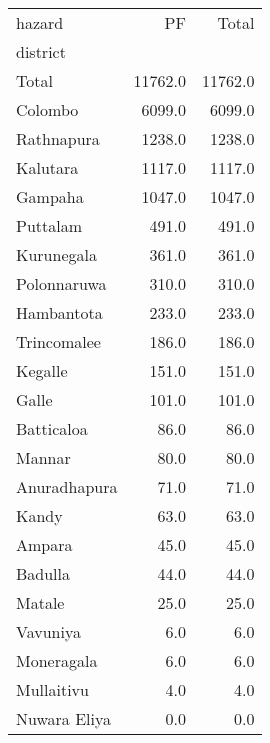 \begin{tabular}{lrr}
\toprule
hazard &       PF &    Total \\
district     &          &          \\
\midrule
Total        &  11762.0 &  11762.0 \\
Colombo      &   6099.0 &   6099.0 \\
Rathnapura   &   1238.0 &   1238.0 \\
Kalutara     &   1117.0 &   1117.0 \\
Gampaha      &   1047.0 &   1047.0 \\
Puttalam     &    491.0 &    491.0 \\
Kurunegala   &    361.0 &    361.0 \\
Polonnaruwa  &    310.0 &    310.0 \\
Hambantota   &    233.0 &    233.0 \\
Trincomalee  &    186.0 &    186.0 \\
Kegalle      &    151.0 &    151.0 \\
Galle        &    101.0 &    101.0 \\
Batticaloa   &     86.0 &     86.0 \\
Mannar       &     80.0 &     80.0 \\
Anuradhapura &     71.0 &     71.0 \\
Kandy        &     63.0 &     63.0 \\
Ampara       &     45.0 &     45.0 \\
Badulla      &     44.0 &     44.0 \\
Matale       &     25.0 &     25.0 \\
Vavuniya     &      6.0 &      6.0 \\
Moneragala   &      6.0 &      6.0 \\
Mullaitivu   &      4.0 &      4.0 \\
Nuwara Eliya &      0.0 &      0.0 \\
\bottomrule
\end{tabular}
